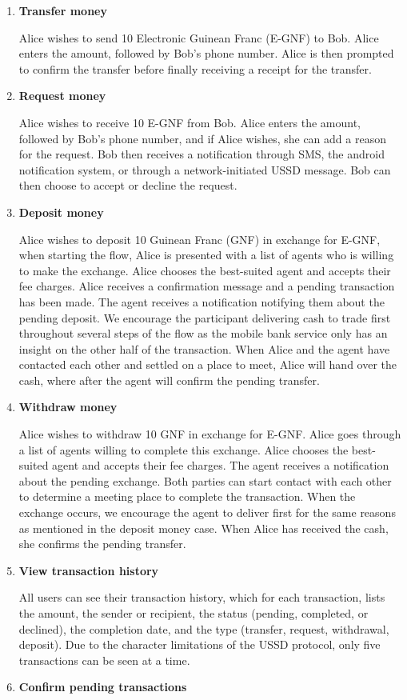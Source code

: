 \documentclass[11pt, a4paper]{article}
\begin{document}
\begin{enumerate}
  \item \textbf{Transfer money}

  Alice wishes to send 10 Electronic Guinean Franc (E-GNF) to Bob. Alice enters the amount, followed by Bob's phone number. Alice is then prompted to confirm the transfer before finally receiving a receipt for the transfer.
  \item \textbf{Request money}

  Alice wishes to receive 10 E-GNF from Bob. Alice enters the amount, followed by Bob's phone number, and if Alice wishes, she can add a reason for the request. Bob then receives a notification through SMS, the android notification system, or through a network-initiated USSD message. Bob can then choose to accept or decline the request.
  \item \textbf{Deposit money}

  Alice wishes to deposit 10 Guinean Franc (GNF) in exchange for E-GNF, when starting the flow, Alice is presented with a list of agents who is willing to make the exchange. Alice chooses the best-suited agent and accepts their fee charges. Alice receives a confirmation message and a pending transaction has been made. The agent receives a notification notifying them about the pending deposit. We encourage the participant delivering cash to trade first throughout several steps of the flow as the mobile bank service only has an insight on the other half of the transaction. When Alice and the agent have contacted each other and settled on a place to meet, Alice will hand over the cash, where after the agent will confirm the pending transfer.
  \item \textbf{Withdraw money}

  Alice wishes to withdraw 10 GNF in exchange for E-GNF. Alice goes through a list of agents willing to complete this exchange. Alice chooses the best-suited agent and accepts their fee charges. The agent receives a notification about the pending exchange. Both parties can start contact with each other to determine a meeting place to complete the transaction. When the exchange occurs, we encourage the agent to deliver first for the same reasons as mentioned in the deposit money case. When Alice has received the cash, she confirms the pending transfer.
  \item \textbf{View transaction history}

  All users can see their transaction history, which for each transaction, lists the amount, the sender or recipient, the status (pending, completed, or declined), the completion date, and the type (transfer, request, withdrawal, deposit). Due to the character limitations of the USSD protocol, only five transactions can be seen at a time.
  \item \textbf{Confirm pending transactions}


\end{enumerate}
\end{document}
